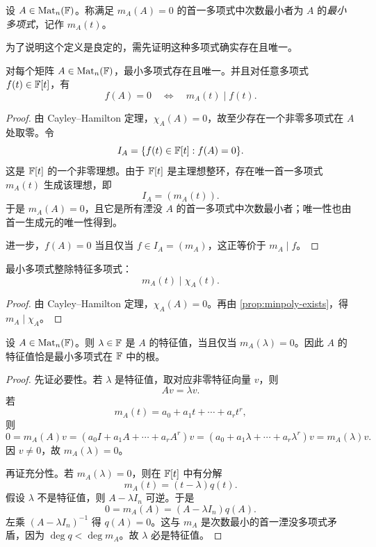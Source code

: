 \begin{definition}
设 \(A\in \mathrm{Mat}_n(\mathbb{F})\)。称满足 \(m_A(A)=0\) 的首一多项式中次数最小者为 \(A\) 的\emph{最小多项式}，记作 \(m_A(t)\)。
\end{definition}

为了说明这个定义是良定的，需先证明这种多项式确实存在且唯一。

\begin{proposition}\label{prop:minpoly-exists}
对每个矩阵 \(A\in \mathrm{Mat}_n(\mathbb{F})\)，最小多项式存在且唯一。并且对任意多项式 \(f(t)\in \mathbb{F}[t]\)，有
\[
f(A)=0\quad\Longleftrightarrow\quad m_A(t)\mid f(t).
\]
\end{proposition}

\begin{proof}
由 Cayley--Hamilton 定理，\(\chi_A(A)=0\)，故至少存在一个非零多项式在 \(A\) 处取零。令
\[
I_A=\{f(t)\in \mathbb{F}[t]:f(A)=0\}.
\]
这是 \(\mathbb{F}[t]\) 的一个非零理想。由于 \(\mathbb{F}[t]\) 是主理想整环，存在唯一首一多项式 \(m_A(t)\) 生成该理想，即
\[
I_A=(m_A(t)).
\]
于是 \(m_A(A)=0\)，且它是所有湮没 \(A\) 的首一多项式中次数最小者；唯一性也由首一生成元的唯一性得到。

进一步，\(f(A)=0\) 当且仅当 \(f\in I_A=(m_A)\)，这正等价于 \(m_A\mid f\)。
\end{proof}

\begin{corollary}\label{cor:minpoly-divides-charpoly}
最小多项式整除特征多项式：
\[
m_A(t)\mid \chi_A(t).
\]
\end{corollary}

\begin{proof}
由 Cayley--Hamilton 定理，\(\chi_A(A)=0\)。再由 \cref{prop:minpoly-exists}，得 \(m_A\mid \chi_A\)。
\end{proof}

\begin{proposition}\label{prop:eigenvalues-roots-minpoly}
设 \(A\in \mathrm{Mat}_n(\mathbb{F})\)。则 \(\lambda\in \mathbb{F}\) 是 \(A\) 的特征值，当且仅当 \(m_A(\lambda)=0\)。因此 \(A\) 的特征值恰是最小多项式在 \(\mathbb{F}\) 中的根。
\end{proposition}

\begin{proof}
先证必要性。若 \(\lambda\) 是特征值，取对应非零特征向量 \(v\)，则
\[
Av=\lambda v.
\]
若
\[
m_A(t)=a_0+a_1t+\cdots+a_rt^r,
\]
则
\[
0=m_A(A)v=(a_0I+a_1A+\cdots+a_rA^r)v=(a_0+a_1\lambda+\cdots+a_r\lambda^r)v=m_A(\lambda)v.
\]
因 \(v\neq 0\)，故 \(m_A(\lambda)=0\)。

再证充分性。若 \(m_A(\lambda)=0\)，则在 \(\mathbb{F}[t]\) 中有分解
\[
m_A(t)=(t-\lambda)q(t).
\]
假设 \(\lambda\) 不是特征值，则 \(A-\lambda I_n\) 可逆。于是
\[
0=m_A(A)=(A-\lambda I_n)q(A).
\]
左乘 \((A-\lambda I_n)^{-1}\) 得 \(q(A)=0\)。这与 \(m_A\) 是次数最小的首一湮没多项式矛盾，因为 \(\deg q<\deg m_A\)。故 \(\lambda\) 必是特征值。
\end{proof}

